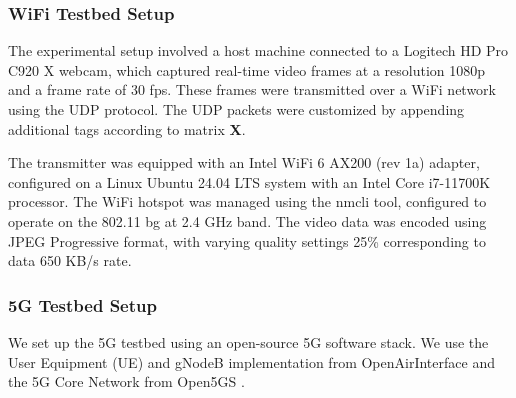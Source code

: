 \subsubsection{WiFi Testbed Setup}
The experimental setup involved a host machine connected to a Logitech HD Pro C920 X webcam, which captured real-time video frames at a resolution 1080p and a frame rate of 30 fps. These frames were transmitted over a WiFi network using the UDP protocol. The UDP packets were customized by appending additional tags according to matrix \textbf{X}.

The transmitter was equipped with an Intel WiFi 6 AX200 (rev 1a) adapter, configured on a Linux Ubuntu 24.04 LTS system with an Intel Core i7-11700K processor. The WiFi hotspot was managed using the nmcli tool, configured to operate on the 802.11 bg at 2.4 GHz band. The video data was encoded using JPEG Progressive format, with varying quality settings 25\% corresponding to data 650  KB/s rate.


\subsubsection{5G Testbed Setup}
We set up the 5G testbed using an open-source 5G software stack. We use the User Equipment (UE) and gNodeB implementation from OpenAirInterface \cite{oai} and the 5G Core Network from Open5GS \cite{open5gs}. 

